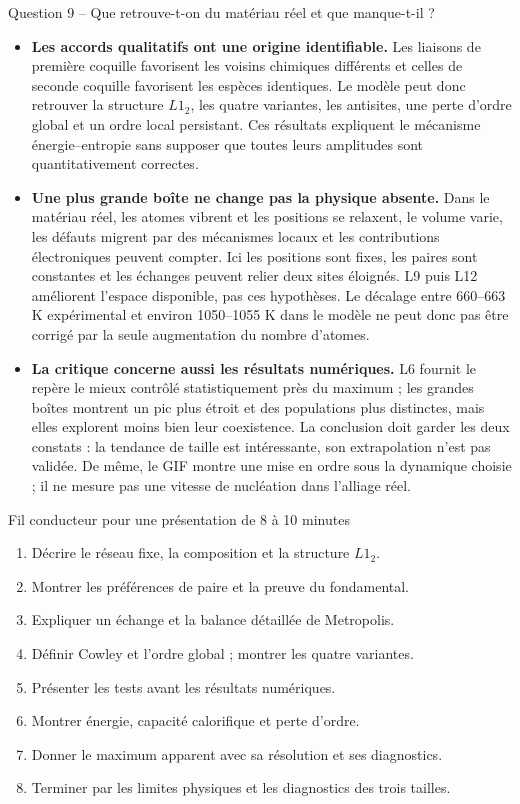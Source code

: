 \documentclass[10pt,a4paper]{article}
\begin{document}
\begin{oral}{Question 9 -- Que retrouve-t-on du matériau réel et que manque-t-il ?}
\begin{itemize}
\item \textbf{Les accords qualitatifs ont une origine identifiable.}
Les liaisons de première coquille favorisent les voisins chimiques
différents et celles de seconde coquille favorisent les espèces identiques.
Le modèle peut donc retrouver la structure $L1_2$, les quatre variantes,
les antisites, une perte d'ordre global et un ordre local persistant.
Ces résultats expliquent le mécanisme énergie--entropie sans supposer
que toutes leurs amplitudes sont quantitativement correctes.
\item \textbf{Une plus grande boîte ne change pas la physique absente.}
Dans le matériau réel, les atomes vibrent et les positions se relaxent,
le volume varie, les défauts migrent par des mécanismes locaux et les
contributions électroniques peuvent compter. Ici les positions sont
fixes, les paires sont constantes et les échanges peuvent relier deux
sites éloignés. L9 puis L12 améliorent l'espace disponible, pas ces
hypothèses. Le décalage entre 660--663 K expérimental et environ
1050--1055 K dans le modèle ne peut donc pas être corrigé par la seule
augmentation du nombre d'atomes.
\item \textbf{La critique concerne aussi les résultats numériques.}
L6 fournit le repère le mieux contrôlé statistiquement près du maximum ;
les grandes boîtes montrent un pic plus étroit et des populations plus
distinctes, mais elles explorent moins bien leur coexistence. La conclusion
doit garder les deux constats : la tendance de taille est intéressante,
son extrapolation n'est pas validée. De même, le GIF montre une mise en
ordre sous la dynamique choisie ; il ne mesure pas une vitesse de
nucléation dans l'alliage réel.
\end{itemize}
\end{oral}

\begin{oral}{Fil conducteur pour une présentation de 8 à 10 minutes}
\begin{enumerate}
\item Décrire le réseau fixe, la composition et la structure $L1_2$.
\item Montrer les préférences de paire et la preuve du fondamental.
\item Expliquer un échange et la balance détaillée de Metropolis.
\item Définir Cowley et l'ordre global ; montrer les quatre variantes.
\item Présenter les tests avant les résultats numériques.
\item Montrer énergie, capacité calorifique et perte d'ordre.
\item Donner le maximum apparent avec sa résolution et ses diagnostics.
\item Terminer par les limites physiques et les diagnostics des trois tailles.
\end{enumerate}
\end{oral}
\end{document}
